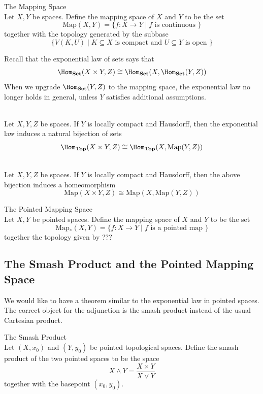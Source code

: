 \documentclass[a4paper]{article}
\begin{document}
\begin{defn}{The Mapping Space}{}\\
Let $X,Y$ be spaces. Define the mapping space of $X$ and $Y$ to be the set $$\text{Map}(X,Y)=\{f:X\to Y\;|\;f\text{ is continuous }\}$$ together with the topology generated by the subbase $$\{V(K,U)\;|\;K\subseteq X\text{ is compact and }U\subseteq Y\text{ is open }\}$$
\end{defn}

Recall that the exponential law of sets says that $$\Hom_\bold{Set}(X\times Y,Z)\cong\Hom_{\bold{Set}}(X,\Hom_\bold{Set}(Y,Z))$$ When we upgrade $\Hom_\bold{Set}(Y,Z)$ to the mapping space, the exponential law no longer holds in general, unless $Y$ satisfies additional assumptions. 

\begin{prp}{}{}\\
Let $X,Y,Z$ be spaces. If $Y$ is locally compact and Hausdorff, then the exponential law induces a natural bijection of sets $$\Hom_\bold{Top}(X\times Y,Z)\cong\Hom_\bold{Top}(X,\text{Map}(Y,Z))$$
\end{prp}

\begin{prp}{}{}\\
Let $X,Y,Z$ be spaces. If $Y$ is locally compact and Hausdorff, then the above bijection induces a homeomorphism $$\text{Map}(X\times Y,Z)\cong\text{Map}(X,\text{Map}(Y,Z))$$
\end{prp}

\begin{defn}{The Pointed Mapping Space}{}\\
Let $X,Y$ be pointed spaces. Define the mapping space of $X$ and $Y$ to be the set $$\text{Map}_\ast(X,Y)=\{f:X\to Y\;|\;f\text{ is a pointed map }\}$$ together the topology given by ???
\end{defn}

\subsection{The Smash Product and the Pointed Mapping Space}
We would like to have a theorem similar to the exponential law in pointed spaces. The correct object for the adjunction is the smash product instead of the usual Cartesian product. 

\begin{defn}{The Smash Product}{}\\
Let $(X,x_0)$ and $(Y,y_0)$ be pointed topological spaces. Define the smash product of the two pointed spaces to be the space $$X\wedge Y=\frac{X\times Y}{X\vee Y}$$ together with the basepoint $(x_0,y_0)$. 
\end{defn}
\end{document}
